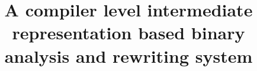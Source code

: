 \documentclass[10pt,twocolumn]{sigplanconf}
\begin{document}
\titlebanner{}        %

\title{A compiler level intermediate representation based binary analysis and rewriting system}

\authorinfo{}
           
           
\maketitle




%









{
%
\begin{singlespace}
\vspace{-3ex}
%

\vspace{-2ex}

%
\end{singlespace}
}

%
%
%

%
\end{document}

